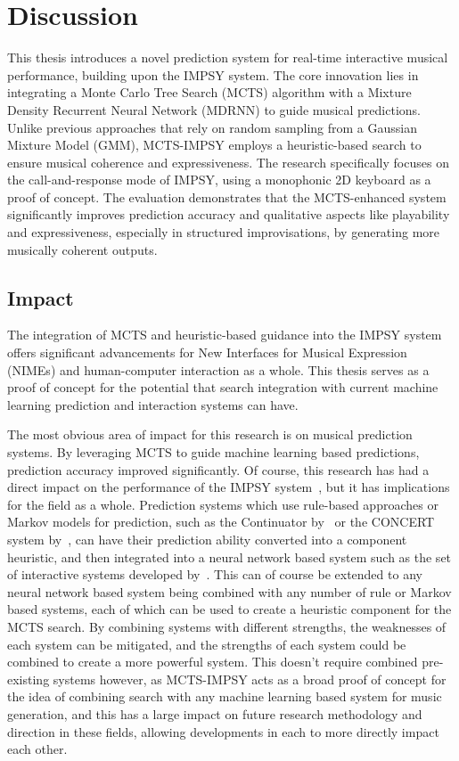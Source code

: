\chapter{Discussion}\label{chap:discussion}

This thesis introduces a novel prediction system for real-time interactive musical performance, building upon the IMPSY system. The core innovation lies in integrating a Monte Carlo Tree Search (MCTS) algorithm with a Mixture Density Recurrent Neural Network (MDRNN) to guide musical predictions. Unlike previous approaches that rely on random sampling from a Gaussian Mixture Model (GMM), MCTS-IMPSY employs a heuristic-based search to ensure musical coherence and expressiveness. The research specifically focuses on the call-and-response mode of IMPSY, using a monophonic 2D keyboard as a proof of concept. The evaluation demonstrates that the MCTS-enhanced system significantly improves prediction accuracy and qualitative aspects like playability and expressiveness, especially in structured improvisations, by generating more musically coherent outputs.

\section{Impact}
The integration of MCTS and heuristic-based guidance into the IMPSY system offers significant advancements for New Interfaces for Musical Expression (NIMEs) and human-computer interaction as a whole. This thesis serves as a proof of concept for the potential that search integration with current machine learning prediction and interaction systems can have.

The most obvious area of impact for this research is on musical prediction systems. By leveraging MCTS to guide machine learning based predictions, prediction accuracy improved significantly. Of course, this research has had a direct impact on the performance of the IMPSY system~\citep{Martin2019IMPSY}, but it has implications for the field as a whole. Prediction systems which use rule-based approaches or Markov models for prediction, such as the Continuator by~\cite{Pachet2002Continuator} or the CONCERT system by~\cite{Mozer1994CONCERT}, can have their prediction ability converted into a component heuristic, and then integrated into a neural network based system such as the set of interactive systems developed by~\cite{Collins2007InteractiveMusic}. This can of course be extended to any neural network based system being combined with any number of rule or Markov based systems, each of which can be used to create a heuristic component for the MCTS search. By combining systems with different strengths, the weaknesses of each system can be mitigated, and the strengths of each system could be combined to create a more powerful system. This doesn't require combined pre-existing systems however, as MCTS-IMPSY acts as a broad proof of concept for the idea of combining search with any machine learning based system for music generation, and this has a large impact on future research methodology and direction in these fields, allowing developments in each to more directly impact each other.

